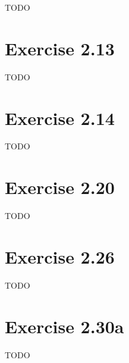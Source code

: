 \documentclass{article}
\begin{document}
TODO

\section{Exercise 2.13}

TODO

\section{Exercise 2.14}

TODO

\section{Exercise 2.20}

TODO

\section{Exercise 2.26}

TODO

\section{Exercise 2.30a}

TODO
\end{document}
